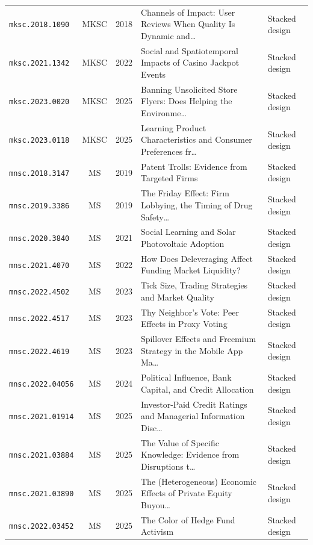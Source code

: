 \begin{longtable}{lccp{}l}
\texttt{mksc.2018.1090} & MKSC & 2018 & \raggedright Channels of Impact: User Reviews When Quality Is Dynamic and\ldots{} & Stacked design \\
\texttt{mksc.2021.1342} & MKSC & 2022 & \raggedright Social and Spatiotemporal Impacts of Casino Jackpot Events & Stacked design \\
\texttt{mksc.2023.0020} & MKSC & 2025 & \raggedright Banning Unsolicited Store Flyers: Does Helping the Environme\ldots{} & Stacked design \\
\texttt{mksc.2023.0118} & MKSC & 2025 & \raggedright Learning Product Characteristics and Consumer Preferences fr\ldots{} & Stacked design \\
\texttt{mnsc.2018.3147} & MS & 2019 & \raggedright Patent Trolls: Evidence from Targeted Firms & Stacked design \\
\texttt{mnsc.2019.3386} & MS & 2019 & \raggedright The Friday Effect: Firm Lobbying, the Timing of Drug Safety\ldots{} & Stacked design \\
\texttt{mnsc.2020.3840} & MS & 2021 & \raggedright Social Learning and Solar Photovoltaic Adoption & Stacked design \\
\texttt{mnsc.2021.4070} & MS & 2022 & \raggedright How Does Deleveraging Affect Funding Market Liquidity? & Stacked design \\
\texttt{mnsc.2022.4502} & MS & 2023 & \raggedright Tick Size, Trading Strategies and Market Quality & Stacked design \\
\texttt{mnsc.2022.4517} & MS & 2023 & \raggedright Thy Neighbor's Vote: Peer Effects in Proxy Voting & Stacked design \\
\texttt{mnsc.2022.4619} & MS & 2023 & \raggedright Spillover Effects and Freemium Strategy in the Mobile App Ma\ldots{} & Stacked design \\
\texttt{mnsc.2022.04056} & MS & 2024 & \raggedright Political Influence, Bank Capital, and Credit Allocation & Stacked design \\
\texttt{mnsc.2021.01914} & MS & 2025 & \raggedright Investor-Paid Credit Ratings and Managerial Information Disc\ldots{} & Stacked design \\
\texttt{mnsc.2021.03884} & MS & 2025 & \raggedright The Value of Specific Knowledge: Evidence from Disruptions t\ldots{} & Stacked design \\
\texttt{mnsc.2021.03890} & MS & 2025 & \raggedright The (Heterogeneous) Economic Effects of Private Equity Buyou\ldots{} & Stacked design \\
\texttt{mnsc.2022.03452} & MS & 2025 & \raggedright The Color of Hedge Fund Activism & Stacked design \\

\end{longtable}
